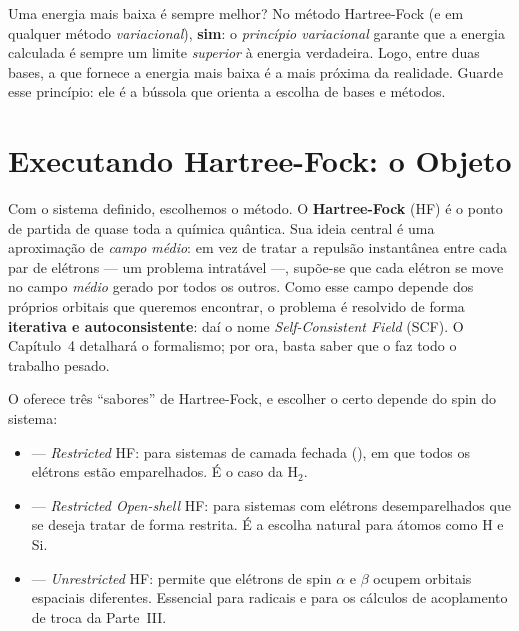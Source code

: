 \begin{caixadica}
Uma energia mais baixa é sempre melhor? No método Hartree-Fock (e em qualquer
método \emph{variacional}), \textbf{sim}: o \emph{princípio variacional} garante
que a energia calculada é sempre um limite \emph{superior} à energia verdadeira.
Logo, entre duas bases, a que fornece a energia mais baixa é a mais próxima da
realidade. Guarde esse princípio: ele é a bússola que orienta a escolha de bases
e métodos.
\end{caixadica}

\section{Executando Hartree-Fock: o Objeto }
\label{sec:scf}

Com o sistema definido, escolhemos o método. O \textbf{Hartree-Fock} (HF) é o
ponto de partida de quase toda a química quântica. Sua ideia central é uma
aproximação de \emph{campo médio}: em vez de tratar a repulsão instantânea entre
cada par de elétrons --- um problema intratável ---, supõe-se que cada elétron se
move no campo \emph{médio} gerado por todos os outros. Como esse campo depende dos
próprios orbitais que queremos encontrar, o problema é resolvido de forma
\textbf{iterativa e autoconsistente}: daí o nome \emph{Self-Consistent Field}
(SCF). O Capítulo~4 detalhará o formalismo; por ora, basta saber que o \pyscf{}
faz todo o trabalho pesado.

O \pyscf{} oferece três ``sabores'' de Hartree-Fock, e escolher o certo depende
do spin do sistema:

\begin{itemize}[leftmargin=*]
  \item {} --- \emph{Restricted} HF: para sistemas de camada fechada
        (), em que todos os elétrons estão emparelhados. É o caso da
        H$_2$.
  \item {} --- \emph{Restricted Open-shell} HF: para sistemas com
        elétrons desemparelhados que se deseja tratar de forma restrita. É a
        escolha natural para átomos como H e Si.
  \item {} --- \emph{Unrestricted} HF: permite que elétrons de spin
        $\alpha$ e $\beta$ ocupem orbitais espaciais diferentes. Essencial para
        radicais e para os cálculos de acoplamento de troca da Parte~III.
\end{itemize}

